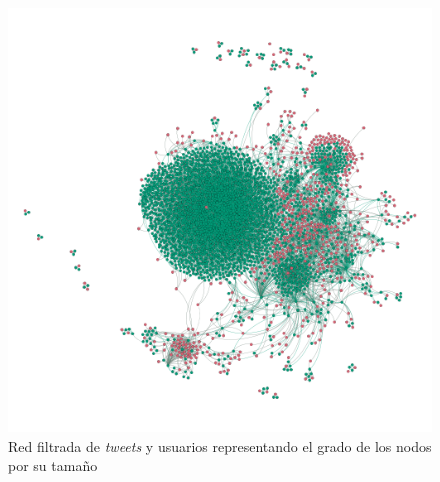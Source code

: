 \begin{figure}
    \centering
    \includegraphics[width=\textwidth]{images/graph/filtered.png}
    \caption{Red filtrada de \textit{tweets} y usuarios representando el grado de los nodos por su tamaño}
    \label{fig:filtered}
\end{figure}
